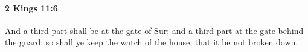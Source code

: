 
		\paragraph{2 Kings 11:6} %
			\label{2KINGS-11-6}

			And a third part shall be at the gate of Sur; and a third part at the gate behind the guard: so shall ye keep the watch of the house, that it be not broken down.



